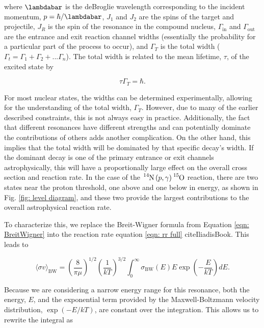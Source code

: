 where $\lambdabar$ is the deBroglie wavelength corresponding to the incident momentum, $p=\hbar/\lambdabar$, $J_1$ and $J_2$ are the spins of the target and projectile, $J_R$ is the spin of the resonance in the compound nucleus, $\Gamma_\mathrm{in}$ and $\Gamma_\mathrm{out}$ are the entrance and exit reaction channel widths (essentially the probability for a particular part of the process to occur), and $\Gamma_T$ is the total width ($\Gamma_t = \Gamma_1 + \Gamma_2 + ... \Gamma_n$). The total width is related to the mean lifetime, $\tau$, of the excited state by 

\begin{equation}
\tau \Gamma_{T} = \hbar.
\label{eqn: width to lifetime}
\end{equation}

For most nuclear states, the widths can be determined experimentally, allowing for the understanding of the total width, $\Gamma_{T}$. However, due to many of the earlier described constraints, this is not always easy in practice. Additionally, the fact that different resonances have different strengths and can potentially dominate the contributions of others adds another complication. On the other hand, this implies that the total width will be dominated by that specific decay's width. If the dominant decay is one of the primary entrance or exit channels astrophysically, this will have a proportionally large effect on the overall cross section and reaction rate. In the case of the $\ce{^{14}N} \left( p, \gamma \right) \ce{^{15}O}$ reaction, there are two states near the proton threshold, one above and one below in energy, as shown in Fig. \ref{fig: level diagram}, and these two provide the largest contributions to the overall astrophysical reaction rate.

To characterize this, we replace the Breit-Wigner formula from Equation \ref{eqn: BreitWigner} into the reaction rate equation \ref{eqn: rr full} cite{IliadisBook}. This leads to 

\begin{equation}
\langle \sigma v \rangle_{\text{BW}} = \left( \frac{8}{\pi \mu} \right) ^{1/2} \left( \frac{1}{kT} \right) ^{3/2} \int_{0}^{\infty} \sigma_{\text{BW} }(E) E \exp \left(-\dfrac{E}{kT} \right) dE.
\label{eqn: reaction rate BW}
\end{equation}

\noindent Because we are considering a narrow energy range for this resonance, both the energy, $E$, and the exponential term provided by the Maxwell-Boltzmann velocity distribution, $\exp \left( -E / kT \right)$, are constant over the integration. This allows us to rewrite the integral as

